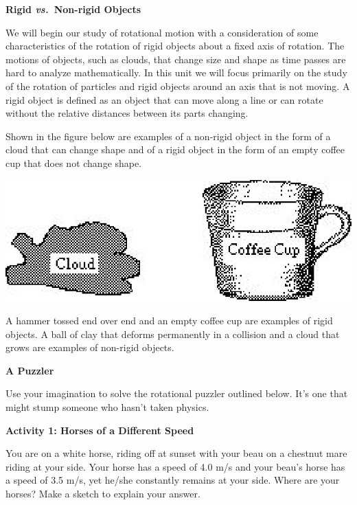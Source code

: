 \textbf{Rigid \textit{vs.}~Non-rigid Objects} 

We will begin our study of rotational motion with a consideration of some characteristics
of the rotation of rigid objects about a fixed axis of rotation. The motions
of objects, such as clouds, that change size and shape as time passes are hard
to analyze mathematically. In this unit we will focus primarily on the study
of the rotation of particles and rigid objects around an axis that is not moving.
A rigid object is defined as an object that can move along a line or can rotate
without the relative distances between its parts changing. 

Shown in the figure below are examples of a non-rigid object in the form of
a cloud that can change shape and of a rigid object in the form of an empty
coffee cup that does not change shape.

\vspace{0.3cm}
{\par\centering \includegraphics{rotation/rotation_fig1.eps} \par}
\vspace{0.3cm}

A hammer tossed end over end and an empty coffee cup are examples of rigid objects.
A ball of clay that deforms permanently in a collision and a cloud that grows
are examples of non-rigid objects. 
\vspace{0.3cm}

\textbf{A Puzzler} 

Use your imagination to solve the rotational puzzler outlined below. It's one
that might stump someone who hasn't taken physics.

\textbf{Activity 1: Horses of a Different Speed }

You are on a white horse, riding off at sunset with your beau on a chestnut
mare riding at your side. Your horse has a speed of 4.0 m/s and your beau's
horse has a speed of 3.5 m/s, yet he/she constantly remains at your side. Where
are your horses? Make a sketch to explain your answer.

